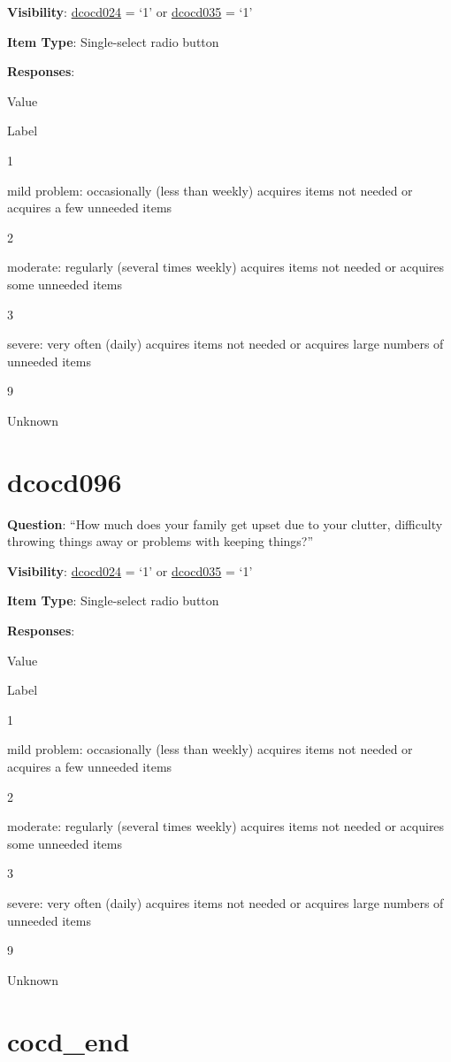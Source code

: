 \documentclass[]{book}
\begin{document}
\textbf{Visibility}: \protect\hyperlink{dcocd024}{dcocd024} = `1' or \protect\hyperlink{dcocd035}{dcocd035} = `1'

\textbf{Item Type}: Single-select radio button

\textbf{Responses}:

Value

Label

1

mild problem: occasionally (less than weekly) acquires items not needed or acquires a few unneeded items

2

moderate: regularly (several times weekly) acquires items not needed or acquires some unneeded items

3

severe: very often (daily) acquires items not needed or acquires large numbers of unneeded items

9

Unknown

\hypertarget{dcocd096}{%
\section{dcocd096}\label{dcocd096}}

\textbf{Question}: ``How much does your family get upset due to your clutter, difficulty throwing things away or problems with keeping things?''

\textbf{Visibility}: \protect\hyperlink{dcocd024}{dcocd024} = `1' or \protect\hyperlink{dcocd035}{dcocd035} = `1'

\textbf{Item Type}: Single-select radio button

\textbf{Responses}:

Value

Label

1

mild problem: occasionally (less than weekly) acquires items not needed or acquires a few unneeded items

2

moderate: regularly (several times weekly) acquires items not needed or acquires some unneeded items

3

severe: very often (daily) acquires items not needed or acquires large numbers of unneeded items

9

Unknown

\hypertarget{cocd_end}{%
\section{cocd\_end}\label{cocd_end}}
\end{document}
